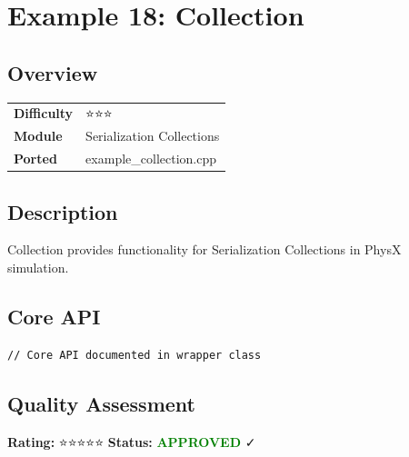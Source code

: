 \section{Example 18: Collection}
\subsection{Overview}
\begin{table}[h]
\centering
\begin{tabular}{|l|l|}
\hline
\textbf{Difficulty} & ⭐⭐⭐ \\
\textbf{Module} & Serialization Collections \\
\textbf{Ported} & example\_collection.cpp \\
\hline
\end{tabular}
\end{table}

\subsection{Description}
Collection provides functionality for Serialization Collections in PhysX simulation.

\subsection{Core API}
\begin{lstlisting}
// Core API documented in wrapper class
\end{lstlisting}

\subsection{Quality Assessment}
\textbf{Rating:} ⭐⭐⭐⭐⭐ \quad \textbf{Status:} \textcolor{green}{\textbf{APPROVED}} ✓
